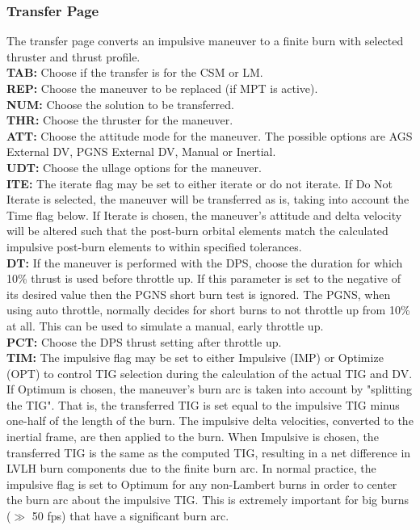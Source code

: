 \documentclass[11pt]{article} %
\begin{document}
\subsubsection{Transfer Page} 

The transfer page converts an impulsive maneuver to a finite burn with selected thruster and thrust profile.\\

\textbf{TAB:} Choose if the transfer is for the CSM or LM.\\
\textbf{REP:} Choose the maneuver to be replaced (if MPT is active).\\
\textbf{NUM:} Choose the solution to be transferred.\\
\textbf{THR:} Choose the thruster for the maneuver.\\
\textbf{ATT:} Choose the attitude mode for the maneuver. The possible options are AGS External DV, PGNS External DV, Manual or Inertial.\\
\textbf{UDT:} Choose the ullage options for the maneuver.\\
\textbf{ITE:} The iterate flag may be set to either iterate or do not iterate. If Do Not Iterate is selected, the maneuver will be transferred as is, taking into account the Time flag below. If Iterate is chosen, the maneuver's attitude and delta velocity will be altered such that the post-burn orbital elements match the calculated impulsive post-burn elements to within specified tolerances.\\
\textbf{DT:} If the maneuver is performed with the DPS, choose the duration for which 10\% thrust is used before throttle up. If this parameter is set to the negative of its desired value then the PGNS short burn test is ignored. The PGNS, when using auto throttle, normally decides for short burns to not throttle up from 10\% at all. This can be used to simulate a manual, early throttle up.\\
\textbf{PCT:} Choose the DPS thrust setting after throttle up.\\
\textbf{TIM:} The impulsive flag may be set to either Impulsive (IMP) or Optimize (OPT) to control TIG selection during the calculation of the actual TIG and DV. If Optimum is chosen, the maneuver's burn arc is taken into account by "splitting the TIG". That is, the transferred TIG is set equal to the impulsive TIG minus one-half of the length of the burn. The impulsive delta velocities, converted to the inertial frame, are then applied to the burn. When Impulsive is chosen, the transferred TIG is the same as the computed TIG, resulting in a net difference in LVLH burn components due to the finite burn arc. In normal practice, the impulsive flag is set to Optimum for any non-Lambert burns in order to center the burn arc about the impulsive TIG. This is extremely important for big burns ($\gg$ 50 fps) that have a significant burn arc.\\
\newpage
\end{document}

